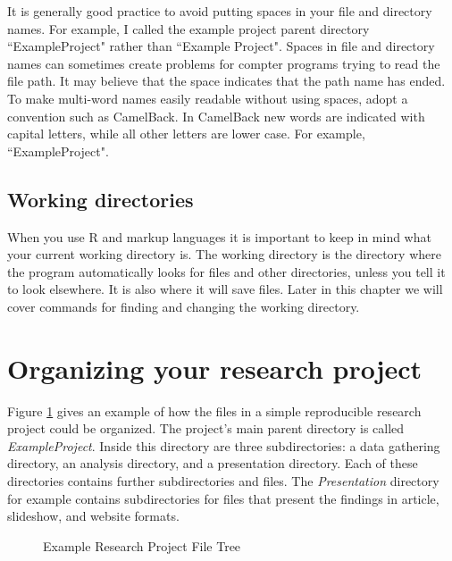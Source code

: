 \documentclass[krantz1]{krantz}
\begin{document}
It is generally good practice to avoid putting spaces in your file and directory names. For example, I called the example project parent directory ``ExampleProject" rather than ``Example Project". Spaces in file and directory names can sometimes create problems for compter programs trying to read the file path. It may believe that the space indicates that the path name has ended. To make multi-word names easily readable without using spaces, adopt a convention such as CamelBack. In CamelBack new words are indicated with capital letters, while all other letters are lower case. For example, ``ExampleProject".

\subsection{Working directories}

When you use R and markup languages it is important to keep in mind what your current working directory is. The working directory is the directory where the program automatically looks for files and other directories, unless you tell it to look elsewhere. It is also where it will save files. Later in this chapter we will cover commands for finding and changing the working directory.

\section{Organizing your research project}

Figure \ref{ExampleTree} gives an example of how the files in a simple reproducible research project could be organized. The project's main parent directory is called {\emph{ExampleProject}}. Inside this directory are three subdirectories: a data gathering directory, an analysis directory, and a presentation directory. Each of these directories contains further subdirectories and files. The {\emph{Presentation}} directory for example contains subdirectories for files that present the findings in article, slideshow, and website formats.

\clearpage
\thispagestyle{plain}
\begin{landscape}
\begin{figure}[th!]
    \caption{Example Research Project File Tree}
    \label{ExampleTree}
    \begin{center}
    
    
    \end{center}
\end{figure}
\end{landscape}
\end{document}
